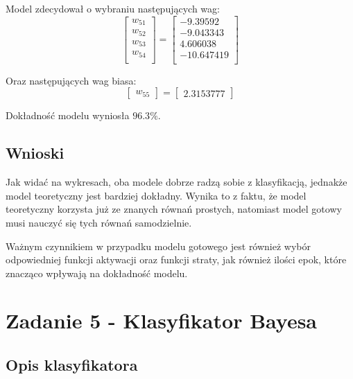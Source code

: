 \documentclass{article}
\begin{document}
Model zdecydował o wybraniu następujących wag:
\begin{equation*}
    \begin{bmatrix}
        w_{51} \\
        w_{52} \\
        w_{53} \\
        w_{54} \\
    \end{bmatrix}
    =
    \begin{bmatrix}
        -9.39592 \\
        -9.043343 \\
        4.606038 \\
        -10.647419 \\
    \end{bmatrix}
\end{equation*}

Oraz następujących wag biasa:
\begin{equation*}
    \begin{bmatrix}
        w_{55}
    \end{bmatrix}
    =
    \begin{bmatrix}
        2.3153777
    \end{bmatrix}
\end{equation*}

Dokładność modelu wyniosła $96.3 \% $.

\subsection{Wnioski}

Jak widać na wykresach, oba modele dobrze radzą sobie z klasyfikacją,
jednakże model teoretyczny jest bardziej dokładny. Wynika to z faktu,
że model teoretyczny korzysta już ze znanych równań prostych, natomiast
model gotowy musi nauczyć się tych równań samodzielnie. 

Ważnym czynnikiem w przypadku modelu gotowego jest również wybór odpowiedniej
funkcji aktywacji oraz funkcji straty, jak również ilości epok, które 
znacząco wpływają na dokładność modelu.

\section{Zadanie 5 - Klasyfikator Bayesa}

\subsection{Opis klasyfikatora}
\end{document}

